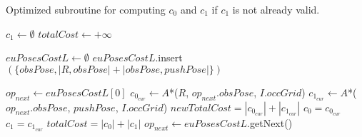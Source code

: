 \begin{algorithm}[H]

  \caption{Optimized subroutine for computing $c_{0}$ and $c_{1}$ if $c_{1}$ is not already valid.}

  \label{alg:04-custom-observation-optimized-compute01c1}

  \begin{algorithmic}[1]

      \State $c_{1} \gets \emptyset$
      \State $totalCost \gets +\infty$


      \State $euPosesCostL \gets \emptyset$  \label{lst:line:occ_heur_1}
        \State $euPosesCostL$.insert$(\{obsPose, |{R, obsPose}| + |{obsPose, pushPose}|\})$
      \EndFor \label{lst:line:occ_heur_2}

       \label{lst:line:traverse_eu_1}
        \State $op_{next} \gets euPosesCostL[0]$
          \State $c_{0_{cur}} \gets A$*($R$, $op_{next}.obsPose$, $I.occGrid$)
          \State $c_{1_{cur}} \gets A$*($op_{next}.obsPose$, $pushPose$, $I.occGrid$)
          \State $newTotalCost = |c_{0_{cur}}| + |c_{1_{cur}}|$
            \State $c_{0} = c_{0_{cur}}$
            \State $c_{1} = c_{1_{cur}}$
            \State $totalCost = |c_{0}| + |c_{1}|$
          \EndIf
          \State $op_{next} \gets euPosesCostL$.getNext()
        \EndWhile
      \EndIf \label{lst:line:traverse_eu_2}
    \EndProcedure

  \end{algorithmic}
\end{algorithm}
